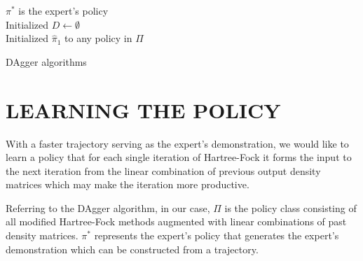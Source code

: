 \documentclass[twoside]{article}
\begin{document}
\begin{algorithm}[htb]
 \label{alg:DAgger}
 $\pi^*$  is the expert’s policy \\
 Initialized $D \leftarrow \emptyset$ \\
 Initialized $\hat{\pi}_1$ to any policy in $\Pi$ \\
 \caption{DAgger algorithms}
\end{algorithm}



\section{LEARNING THE POLICY}




% 

With a faster trajectory serving as the expert's demonstration, we would like to learn a policy that for each single iteration of Hartree-Fock it forms the input to the next iteration from the linear combination of previous output density matrices which may make the iteration more productive.   

Referring to the DAgger algorithm, in our case, $\Pi$ is the policy class consisting of all modified Hartree-Fock methods augmented with linear combinations of past density matrices. $\pi^*$ represents the expert's policy that generates the expert's demonstration which can be constructed from a trajectory. 
\end{document}
